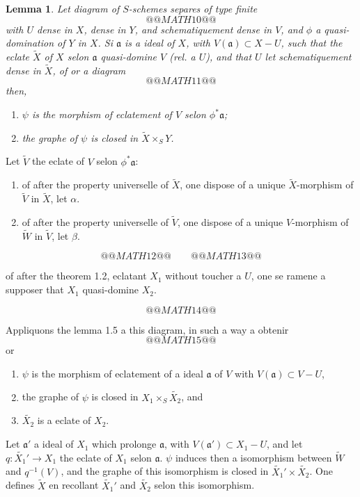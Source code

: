 \documentclass[11pt,a4paper]{article}
\theoremstyle{plain}
\newtheorem{lemma}[theorem]{Lemma}
\theoremstyle{definition}
\begin{document}
\begin{lemma}
Let diagram of $S$-schemes separes of type finite
\[
@@MATH10@@
\]
with $U$ dense in $X$, dense in $Y$, and schematiquement dense in $V$, and $\phi$ a quasi-domination of $Y$ in $X$. Si $\mathfrak{a}$ is a ideal of $X$, with $V(\mathfrak{a}) \subset X - U$, such that the eclate $\widetilde{X}$ of $X$ selon $\mathfrak{a}$ quasi-domine $V$ (rel. a $U$), and that $U$ let schematiquement dense in $\widetilde{X}$, of or a diagram
\[
@@MATH11@@
\]
then,
\begin{enumerate}[label=(\alph*)]
\item $\psi$ is the morphism of eclatement of $V$ selon $\phi^*\mathfrak{a}$;
\item the graphe of $\psi$ is closed in $\widetilde{X} \times_S Y$.
\end{enumerate}
\end{lemma}

Let $\widetilde{V}$ the eclate of $V$ selon $\phi^*\mathfrak{a}$:
\begin{enumerate}[label=(\arabic*)]
\item of after the property universelle of $\widetilde{X}$, one dispose of a unique $\widetilde{X}$-morphism of $\widetilde{V}$ in $\widetilde{X}$, let $\alpha$.
\item of after the property universelle of $\widetilde{V}$, one dispose of a unique $V$-morphism of $\widetilde{W}$ in $\widetilde{V}$, let $\beta$.
\end{enumerate}

\[
@@MATH12@@
\qquad
@@MATH13@@
\]

of after the theorem 1.2, eclatant $X_1$ without toucher a $U$, one se ramene a supposer that $X_1$ quasi-domine $X_2$.

\[
@@MATH14@@
\]

Appliquons the lemma 1.5 a this diagram, in such a way a obtenir
\[
@@MATH15@@
\]
or
\begin{enumerate}[label=(\alph*)]
\item $\psi$ is the morphism of eclatement of a ideal $\mathfrak{a}$ of $V$ with $V(\mathfrak{a}) \subset V - U$,
\item the graphe of $\psi$ is closed in $X_1 \times_S \widetilde{X_2}$, and
\item $\widetilde{X_2}$ is a eclate of $X_2$.
\end{enumerate}

Let $\mathfrak{a}'$ a ideal of $X_1$ which prolonge $\mathfrak{a}$, with $V(\mathfrak{a}') \subset X_1 - U$, and let $q: \widetilde{X_1}' \to X_1$ the eclate of $X_1$ selon $\mathfrak{a}$. $\psi$ induces then a isomorphism between $\widetilde{W}$ and $q^{-1}(V)$, and the graphe of this isomorphism is closed in $\widetilde{X_1}' \times \widetilde{X_2}$. One defines $\widetilde{X}$ en recollant $\widetilde{X_1}'$ and $\widetilde{X_2}$ selon this isomorphism.
\end{document}
